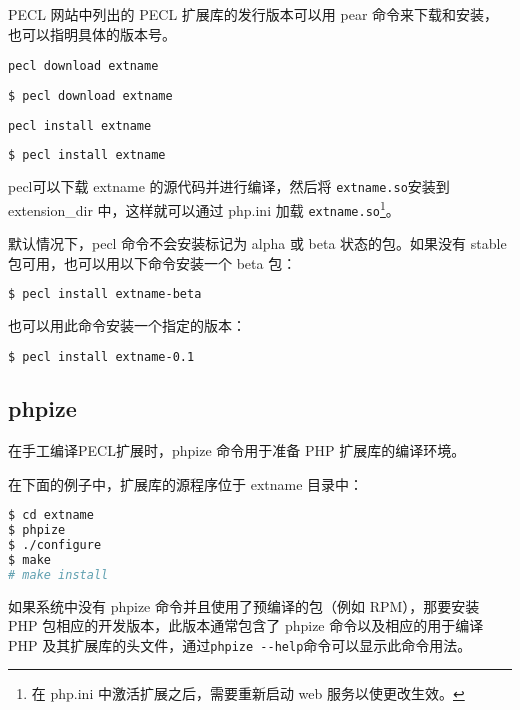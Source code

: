 PECL 网站中列出的 PECL 扩展库的发行版本可以用 pear 命令来下载和安装，也可以指明具体的版本号。

\begin{compactitem}
\item \texttt{pecl download extname}

\begin{lstlisting}[language=bash]
$ pecl download extname
\end{lstlisting}

\item \texttt{pecl install extname}

\begin{lstlisting}[language=bash]
$ pecl install extname
\end{lstlisting}

\end{compactitem}

pecl可以下载 extname 的源代码并进行编译，然后将 \texttt{extname.so}安装到 extension\_dir 中，这样就可以通过 php.ini 加载 \texttt{extname.so}\footnote{在 php.ini 中激活扩展之后，需要重新启动 web 服务以使更改生效。}。

默认情况下，pecl 命令不会安装标记为 alpha 或 beta 状态的包。如果没有 stable 包可用，也可以用以下命令安装一个 beta 包：

\begin{lstlisting}[language=bash]
$ pecl install extname-beta
\end{lstlisting}

也可以用此命令安装一个指定的版本：

\begin{lstlisting}[language=bash]
$ pecl install extname-0.1
\end{lstlisting}

\subsection{phpize}


在手工编译PECL扩展时，phpize 命令用于准备 PHP 扩展库的编译环境。

在下面的例子中，扩展库的源程序位于 extname 目录中：

\begin{lstlisting}[language=bash]
$ cd extname
$ phpize
$ ./configure
$ make
# make install
\end{lstlisting}

如果系统中没有 phpize 命令并且使用了预编译的包（例如 RPM），那要安装 PHP 包相应的开发版本，此版本通常包含了 phpize 命令以及相应的用于编译 PHP 及其扩展库的头文件，通过\texttt{phpize -\/-help}命令可以显示此命令用法。

